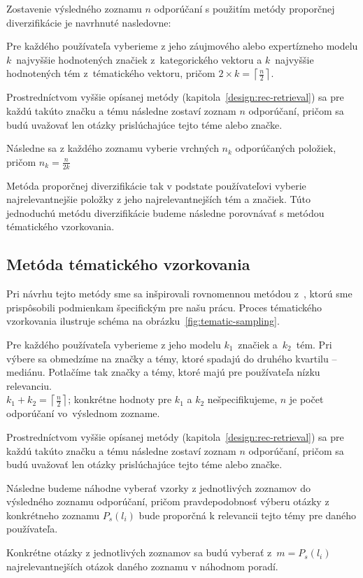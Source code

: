 Zostavenie výsledného zoznamu $n$ odporúčaní s použitím metódy proporčnej diverzifikácie je navrhnuté nasledovne:

\begin{my_enumerate}
\item{
    Pre každého používateľa vyberieme z jeho záujmového alebo expertízneho modelu $k$~najvyššie hodnotených značiek
    z~kategorického vektoru a $k$~najvyššie hodnotených tém z~tématického vektoru, pričom
    $2 \times k = \left\lceil\frac{n}{2}\right\rceil$.
}
\item{
    Prostredníctvom vyššie opísanej metódy (kapitola~\ref{design:rec-retrieval}) sa pre každú takúto značku a tému
    následne zostaví zoznam $n$ odporúčaní, pričom sa budú uvažovať len otázky prislúchajúce tejto téme alebo značke.
}
\item{
    Následne sa z každého zoznamu vyberie vrchných $n_k$ odporúčaných položiek, pričom $n_k = \frac{n}{2k}$
}
\end{my_enumerate}

Metóda proporčnej diverzifikácie tak v podstate používateľovi vyberie najrelevantnejšie položky z jeho najrelevantnejších
tém a značiek. Túto jednoduchú metódu diverzifikácie budeme následne porovnávať s metódou tématického vzorkovania.


\subsection{Metóda tématického vzorkovania}

Pri návrhu tejto metódy sme sa inšpirovali rovnomennou metódou z~\cite{Szpektor2013}, ktorú sme prispôsobili
podmienkam špecifickým pre našu prácu. Proces tématického vzorkovania ilustruje schéma na obrázku~\ref{fig:tematic-sampling}.

\begin{my_enumerate}
\item{
    Pre každého používateľa vyberieme z jeho modelu $k_1$~značiek a~$k_2$~tém. Pri výbere sa obmedzíme na značky a témy,
    ktoré spadajú do druhého kvartilu -- mediánu. Potlačíme tak značky a témy, ktoré majú pre používateľa nízku relevanciu.\\
    $k_1 + k_2 = \left\lceil\frac{n}{2}\right\rceil$; konkrétne hodnoty pre $k_1$ a $k_2$ nešpecifikujeme, $n$ je počet
    odporúčaní vo~výslednom zozname.
}
\item{
    Prostredníctvom vyššie opísanej metódy (kapitola~\ref{design:rec-retrieval}) sa pre každú takúto značku a tému
    následne zostaví zoznam $n$ odporúčaní, pričom sa budú uvažovať len otázky prislúchajúce tejto téme alebo značke.
}
\item{
    Následne budeme náhodne vyberať vzorky z jednotlivých zoznamov do výsledného zoznamu odporúčaní, pričom pravdepodobnosť
    výberu otázky z konkrétneho zoznamu $P_s(l_i)$ bude proporčná k relevancii tejto témy pre daného používateľa.
}
\item{
    Konkrétne otázky z jednotlivých zoznamov sa budú vyberať z~$m = P_s(l_i)$ najrelevantnejších otázok daného zoznamu
    v náhodnom poradí.

}
\end{my_enumerate}

